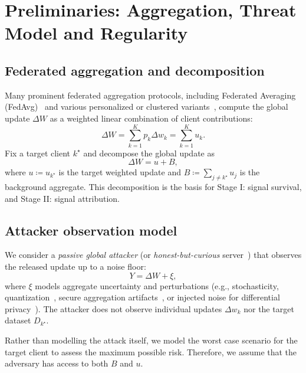 \documentclass{article}
\theoremstyle{plain}
\theoremstyle{definition}
\theoremstyle{remark}
\numberwithin{theorem}{section}
\numberwithin{definition}{section}
\numberwithin{remark}{section}
\numberwithin{lemma}{section}
\numberwithin{assumption}{section}
\newcommand{\tindex}{k^\star}
\newcommand{\uk}[1]{u_{#1}}
\newcommand{\utarget}{u}
\newcommand{\ukstar}{\uk{\tindex}}
\newcommand{\pdelta}[1]{p_{#1}\Delta w_{#1}}
\begin{document}
\section{Preliminaries: Aggregation, Threat Model and Regularity}

\subsection{Federated aggregation and decomposition}

Many prominent federated aggregation protocols, including Federated Averaging (FedAvg)~\cite{mcmahan2017communication} and various personalized or clustered variants~\cite{kairouz2021advances}, compute the global update $\Delta W$ as a weighted linear combination of client contributions:
\begin{equation}
\label{eq:fedavg}
\Delta W = \sum_{k=1}^K \pdelta{k} = \sum_{k=1}^K \uk{k}.
\end{equation}
Fix a target client $\tindex$ and decompose the global update as
\begin{equation}
\label{eq:decomp}
\Delta W = \utarget + B,
\end{equation}
where $\utarget \coloneqq \ukstar$ is the target weighted update and $B \coloneqq \sum_{j\neq \tindex} \uk{j}$ is the background aggregate.
This decomposition is the basis for Stage I: signal survival, and Stage II: signal attribution.

\subsection{Attacker observation model}

We consider a \textit{passive global attacker} (or \textit{honest-but-curious} server~\cite{mothukuri2021survey,kairouz2021advances}) that observes the released update up to a noise floor:
\begin{equation}
\label{eq:obs}
Y=\Delta W+\xi,
\end{equation}
where $\xi$ models aggregate uncertainty and perturbations (e.g., stochasticity, quantization~\cite{kang2024effect}, secure aggregation artifacts~\cite{gilbert2022secure}, or injected noise for differential privacy~\cite{kim2022effects}).
The attacker does not observe individual updates $\Delta w_k$ nor the target dataset $D_{\tindex}$.

Rather than modelling the attack itself, we model the worst case scenario for the target client to assess the maximum possible risk. Therefore, we assume that the adversary has access to both $B$ and $\utarget$.
\end{document}
